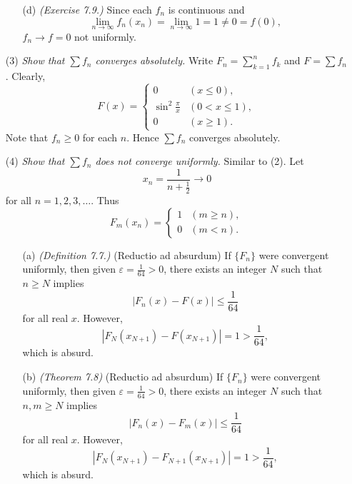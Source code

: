 \documentclass{article}
\begin{document}
\begin{enumerate}
\begin{enumerate}
  \item[(d)]
  \emph{(Exercise 7.9.)}
  Since
  each $f_n$ is continuous and
  \[
    \lim_{n \to \infty} f_n(x_n) = \lim_{n \to \infty} 1 = 1 \neq 0 = f(0),
  \]
  $f_n \to f = 0$ not uniformly.
  \end{enumerate}

\item[(3)]
\emph{Show that $\sum f_n$ converges absolutely.}
Write $F_n = \sum_{k=1}^{n} f_k$ and $F = \sum f_n$.
Clearly,
\begin{equation*}
  F(x) =
    \begin{cases}
      0                    & (x \leq 0), \\
      \sin^2 \frac{\pi}{x} & (0 < x \leq 1), \\
      0                    & (x \geq 1).
    \end{cases}
\end{equation*}
Note that $f_n \geq 0$ for each $n$.
Hence $\sum f_n$ converges absolutely.

\item[(4)]
\emph{Show that $\sum f_n$ does not converge uniformly.}
Similar to (2).
Let
\[
  x_n = \frac{1}{n+\frac{1}{2}} \to 0
\]
for all $n=1,2,3,\ldots$.
Thus
\begin{equation*}
  F_m(x_n) =
    \begin{cases}
      1 & (m \geq n), \\
      0 & (m < n).
    \end{cases}
\end{equation*}

  \begin{enumerate}
  \item[(a)]
  \emph{(Definition 7.7.)}
  (Reductio ad absurdum)
  If $\{F_n\}$ were convergent uniformly, then
  given $\varepsilon = \frac{1}{64} > 0$,
  there exists an integer $N$ such that $n \geq N$ implies
  \[
    |F_n(x) - F(x)| \leq \frac{1}{64}
  \]
  for all real $x$.
  However,
  \[
    |F_N(x_{N+1}) - F(x_{N+1})| =  1 > \frac{1}{64},
  \]
  which is absurd.

  \item[(b)]
  \emph{(Theorem 7.8)}
  (Reductio ad absurdum)
  If $\{F_n\}$ were convergent uniformly, then
  given $\varepsilon = \frac{1}{64} > 0$,
  there exists an integer $N$ such that $n,m \geq N$ implies
  \[
    |F_n(x) - F_m(x)| \leq \frac{1}{64}
  \]
  for all real $x$.
  However,
  \[
    |F_N(x_{N+1}) - F_{N+1}(x_{N+1})| =  1 > \frac{1}{64},
  \]which is absurd.


\end{enumerate}
\end{enumerate}
\end{document}

